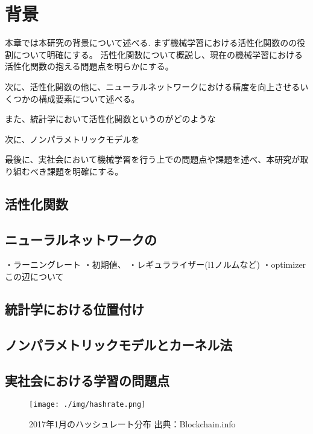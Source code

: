 \chapter{背景}
\label{background}

本章では本研究の背景について述べる.
まず機械学習における活性化関数のの役割について明確にする。
活性化関数について概説し、現在の機械学習における活性化関数の抱える問題点を明らかにする。

次に、活性化関数の他に、ニューラルネットワークにおける精度を向上させるいくつかの構成要素について述べる。


また、統計学において活性化関数というのがどのような


次に、ノンパラメトリックモデルを

最後に、実社会において機械学習を行う上での問題点や課題を述べ、本研究が取り組むべき課題を明確にする。



\section{活性化関数}
\section{ニューラルネットワークの}
・ラーニングレート
・初期値、
・レギュラライザー(l1ノルムなど)
・optimizer
この辺について
\section{統計学における位置付け}
\section{ノンパラメトリックモデルとカーネル法}
\section{実社会における学習の問題点}


\begin{figure}[h]
    \begin{center}
        \texttt{[image: ./img/hashrate.png]}
        \caption{2017年1月のハッシュレート分布 出典：Blockchain.info\cite{bitcoinhashrate}}
        \label{img:hashrate}
    \end{center}
\end{figure}
\fi
